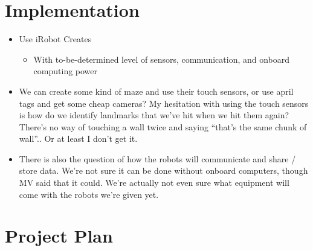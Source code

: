 \documentclass[11pt]{article}
\begin{document}
\section{Implementation}

\begin{itemize}
    \item Use iRobot Creates
        \begin{itemize}
            \item With to-be-determined level of sensors, communication, and onboard computing power
        \end{itemize}

    \item We can create some kind of maze and use their touch sensors, or use april tags and get some cheap cameras? My hesitation with using the touch sensors is how do we identify landmarks that we've hit when we hit them again? There's no way of touching a wall twice and saying ``that's the same chunk of wall''.. Or at least I don't get it.

    \item There is also the question of how the robots will communicate and share / store data.  We're not sure it can be done without onboard computers, though MV said that it could.  We're actually not even sure what equipment will come with the robots we're given yet.  

\end{itemize}

\section*{Project Plan}
\end{document}
